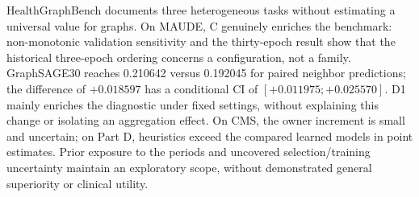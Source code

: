 HealthGraphBench documents three heterogeneous tasks without estimating a universal value for graphs. On MAUDE, C genuinely enriches the benchmark: non-monotonic validation sensitivity and the thirty-epoch result show that the historical three-epoch ordering concerns a configuration, not a family. GraphSAGE30 reaches 0.210642 versus 0.192045 for paired neighbor predictions; the difference of $+0.018597$ has a conditional CI of $[+0.011975;+0.025570]$. D1 mainly enriches the diagnostic under fixed settings, without explaining this change or isolating an aggregation effect. On CMS, the owner increment is small and uncertain; on Part D, heuristics exceed the compared learned models in point estimates. Prior exposure to the periods and uncovered selection/training uncertainty maintain an exploratory scope, without demonstrated general superiority or clinical utility.
